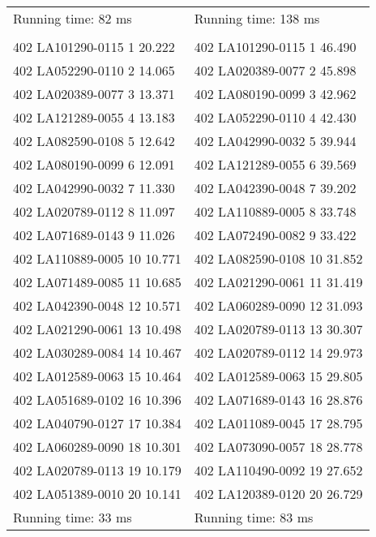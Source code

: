 \begin{tabular}{ l l }
Running time: 82 ms & Running time: 138 ms\\
\\
402 LA101290-0115 1 20.222 & 402 LA101290-0115 1 46.490\\
402 LA052290-0110 2 14.065 & 402 LA020389-0077 2 45.898\\
402 LA020389-0077 3 13.371 & 402 LA080190-0099 3 42.962\\
402 LA121289-0055 4 13.183 & 402 LA052290-0110 4 42.430\\
402 LA082590-0108 5 12.642 & 402 LA042990-0032 5 39.944\\
402 LA080190-0099 6 12.091 & 402 LA121289-0055 6 39.569\\
402 LA042990-0032 7 11.330 & 402 LA042390-0048 7 39.202\\
402 LA020789-0112 8 11.097 & 402 LA110889-0005 8 33.748\\
402 LA071689-0143 9 11.026 & 402 LA072490-0082 9 33.422\\
402 LA110889-0005 10 10.771 & 402 LA082590-0108 10 31.852\\
402 LA071489-0085 11 10.685 & 402 LA021290-0061 11 31.419\\
402 LA042390-0048 12 10.571 & 402 LA060289-0090 12 31.093\\
402 LA021290-0061 13 10.498 & 402 LA020789-0113 13 30.307\\
402 LA030289-0084 14 10.467 & 402 LA020789-0112 14 29.973\\
402 LA012589-0063 15 10.464 & 402 LA012589-0063 15 29.805\\
402 LA051689-0102 16 10.396 & 402 LA071689-0143 16 28.876\\
402 LA040790-0127 17 10.384 & 402 LA011089-0045 17 28.795\\
402 LA060289-0090 18 10.301 & 402 LA073090-0057 18 28.778\\
402 LA020789-0113 19 10.179 & 402 LA110490-0092 19 27.652\\
402 LA051389-0010 20 10.141 & 402 LA120389-0120 20 26.729\\
Running time: 33 ms & Running time: 83 ms
\end{tabular}
\newpage
